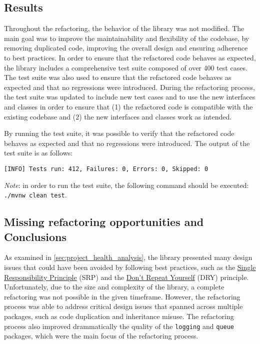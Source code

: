 
\subsection{Results}

Throughout the refactoring, the behavior of the library was not modified. The main goal was to improve the maintainability and flexibility of the codebase, by removing duplicated code, improving the overall design and ensuring adherence to best practices. In order to ensure that the refactored code behaves as expected, the library includes a comprehensive test suite composed of over 400 test cases. The test suite was also used to ensure that the refactored code behaves as expected and that no regressions were introduced. During the refactoring process, the test suite was updated to include new test cases and to use the new interfaces and classes in order to ensure that (1) the refactored code is compatible with the existing codebase and (2) the new interfaces and classes work as intended.

By running the test suite, it was possible to verify that the refactored code behaves as expected and that no regressions were introduced. The output of the test suite is as follows:


\begin{center}
	\begin{minipage}{0.7\linewidth}
		\begin{verbatim}
[INFO] Tests run: 412, Failures: 0, Errors: 0, Skipped: 0
    \end{verbatim}
	\end{minipage}
\end{center}

\noindent \textit{Note}: in order to run the test suite, the following command should be executed: \texttt{./mvnw clean test}.

\subsection{Missing refactoring opportunities and Conclusions}

As examined in \autoref{sec:project_health_analysis}, the library presented many design issues that could have been avoided by following best practices, such as the \href{https://en.wikipedia.org/wiki/Single_responsibility_principle}{Single Responsibility Principle} (SRP) and the \href{https://en.wikipedia.org/wiki/Don%27t_repeat_yourself}{Don't Repeat Yourself} (DRY) principle. Unfortunately, due to the size and complexity of the library, a complete refactoring was not possible in the given timeframe. However, the refactoring process was able to address critical design issues that spanned across multiple packages, such as code duplication and inheritance misuse. The refactoring process also improved drammatically the quality of the \texttt{logging} and \texttt{queue} packages, which were the main focus of the refactoring process.

